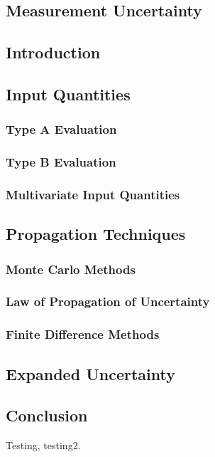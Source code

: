 \documentclass[../thesis.tex]{subfiles}
\begin{document}
\begin{refsection}
\chapter{Measurement Uncertainty}
\section{Introduction}
\section{Input Quantities}
\subsection{Type A Evaluation}
\subsection{Type B Evaluation}
\subsection{Multivariate Input Quantities}
\section{Propagation Techniques}
\subsection{Monte Carlo Methods}
\subsection{Law of Propagation of Uncertainty}
\subsection{Finite Difference Methods}
\section{Expanded Uncertainty}
\section{Conclusion}
Testing, testing2\cite{Stant_2017}.
\printbibliography
\end{refsection}
\end{document}
